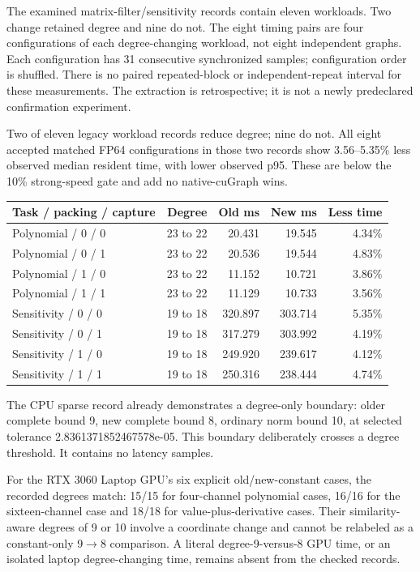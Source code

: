 \documentclass[10pt]{article}
\begin{document}
The examined matrix-filter/sensitivity records contain eleven workloads. Two change retained degree and nine do not. The eight timing pairs are four configurations of each degree-changing workload, not eight independent graphs. Each configuration has 31 consecutive synchronized samples; configuration order is shuffled. There is no paired repeated-block or independent-repeat interval for these measurements. The extraction is retrospective; it is not a newly predeclared confirmation experiment.

Two of eleven legacy workload records reduce degree; nine do not. All eight accepted matched FP64 configurations in those two records show 3.56--5.35\% less observed median resident time, with lower observed p95. These are below the 10\% strong-speed gate and add no native-cuGraph wins.

\begin{center}\small\begin{tabular}{lrrrr}\toprule
Task / packing / capture & Degree & Old ms & New ms & Less time \\
\midrule
Polynomial / 0 / 0 & 23 to 22 & 20.431 & 19.545 & 4.34\% \\
Polynomial / 0 / 1 & 23 to 22 & 20.536 & 19.544 & 4.83\% \\
Polynomial / 1 / 0 & 23 to 22 & 11.152 & 10.721 & 3.86\% \\
Polynomial / 1 / 1 & 23 to 22 & 11.129 & 10.733 & 3.56\% \\
Sensitivity / 0 / 0 & 19 to 18 & 320.897 & 303.714 & 5.35\% \\
Sensitivity / 0 / 1 & 19 to 18 & 317.279 & 303.992 & 4.19\% \\
Sensitivity / 1 / 0 & 19 to 18 & 249.920 & 239.617 & 4.12\% \\
Sensitivity / 1 / 1 & 19 to 18 & 250.316 & 238.444 & 4.74\% \\
\bottomrule\end{tabular}\end{center}

The CPU sparse record already demonstrates a degree-only boundary: older complete bound 9, new complete bound 8, ordinary norm bound 10, at selected tolerance 2.8361371852467578e-05. This boundary deliberately crosses a degree threshold. It contains no latency samples.

For the RTX 3060 Laptop GPU's six explicit old/new-constant cases, the recorded degrees match: 15/15 for four-channel polynomial cases, 16/16 for the sixteen-channel case and 18/18 for value-plus-derivative cases. Their similarity-aware degrees of 9 or 10 involve a coordinate change and cannot be relabeled as a constant-only 9$\to$8 comparison. A literal degree-9-versus-8 GPU time, or an isolated laptop degree-changing time, remains absent from the checked records.
\end{document}
